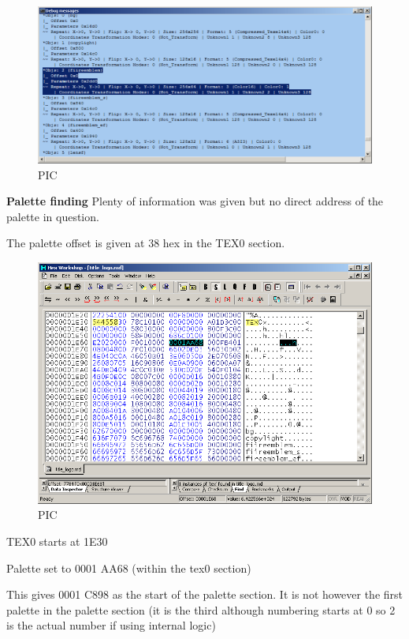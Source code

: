 \documentclass[
]{book}
\begin{document}
\begin{figure}
\centering
\includegraphics{images/73_home_fast6191_romhackingguide_unrenamed_file___gguidegraphics3dminorNSMBDtexturedecoding_5.png}
\caption{PIC}
\end{figure}

\textbf{Palette finding} Plenty of information was given but no direct address of the palette in question.

The palette offset is given at 38 hex in the TEX0 section.

\begin{figure}
\centering
\includegraphics{images/74_home_fast6191_romhackingguide_unrenamed_file___gguidegraphics3dminorNSMBDtexturedecoding_7.png}
\caption{PIC}
\end{figure}

TEX0 starts at 1E30

Palette set to 0001 AA68 (within the tex0 section)

This gives 0001 C898 as the start of the palette section. It is not however the first palette in the palette section (it is the third although numbering starts at 0 so 2 is the actual number if using internal logic)
\end{document}
